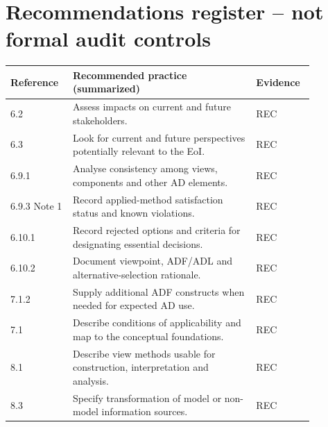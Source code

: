 \documentclass[11pt,letterpaper]{article}
\begin{document}
\section{Recommendations register -- not formal audit controls}
\begin{longtable}{p{0.16\linewidth}p{0.55\linewidth}p{0.16\linewidth}}\toprule\textbf{Reference}&\textbf{Recommended practice (summarized)}&\textbf{Evidence}\\\midrule\endhead
6.2&Assess impacts on current and future stakeholders.&REC\\
6.3&Look for current and future perspectives potentially relevant to the EoI.&REC\\
6.9.1&Analyse consistency among views, components and other AD elements.&REC\\
6.9.3 Note 1&Record applied-method satisfaction status and known violations.&REC\\
6.10.1&Record rejected options and criteria for designating essential decisions.&REC\\
6.10.2&Document viewpoint, ADF/ADL and alternative-selection rationale.&REC\\
7.1.2&Supply additional ADF constructs when needed for expected AD use.&REC\\
7.1&Describe conditions of applicability and map to the conceptual foundations.&REC\\
8.1&Describe view methods usable for construction, interpretation and analysis.&REC\\
8.3&Specify transformation of model or non-model information sources.&REC\\\bottomrule\end{longtable}
\end{document}
